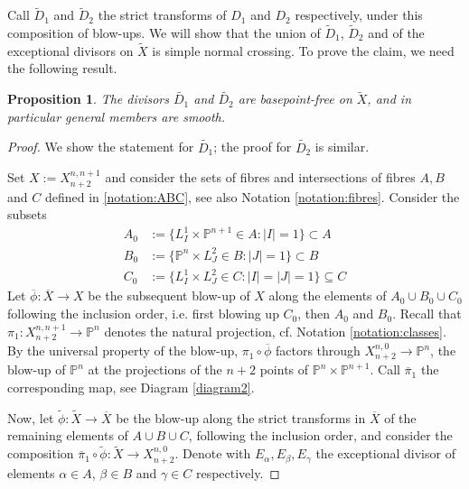 \documentclass[a4paper,11pt]{article}
\newtheorem{proposition}[theorem]{Proposition}
\newcommand{\PP}{\mathbb P}
\begin{document}
Call $\widetilde{D}_1$ and $\widetilde{D}_2$ the strict transforms of $D_1$ and $D_2$ respectively, under this composition of blow-ups. 
%
We will show that the union of $\widetilde{D}_1$, $\widetilde{D}_2$ and of the exceptional divisors on $\widetilde{X}$ is simple normal crossing. 
To prove the claim, we need the following result.

\begin{proposition}\label{basepoint-freeness}
 The divisors $\widetilde{D_1}$ and $\widetilde{D_2}$ are basepoint-free on $\widetilde{X}$, and in particular general members are smooth.
\end{proposition}
  \begin{proof}
We show the statement for $\widetilde{D_1}$; the proof for $\widetilde{D_2}$ is similar.

Set $X:=X^{n,n+1}_{n+2}$ and consider the sets of fibres and intersections of fibres $A,B$ and $C$ defined in \eqref{notation:ABC}, see also Notation \ref{notation:fibres}.
Consider the subsets 
\begin{align*} 
A_0& :=\{L_I^1\times\PP^{n+1}\in A: |I|=1\}\subset A\\ 
B_0&:=\{\PP^n\times L_J^2\in B: |J|=1\}\subset B\\
C_0&:=\{L^1_I\times L^2_J \in C: |I|=|J|=1\}\subseteq C
\end{align*}
Let  $\overline{\phi}:\overline{X}\to X$ be the subsequent blow-up of $X$ along the elements of $A_0\cup B_0\cup C_0$ following the inclusion order, i.e. first blowing up $C_0$, then $A_0$ and $B_0$. Recall that  $\pi_1 \colon X^{n,n+1}_{n+2}\to \PP^n$ denotes  the natural projection, cf. Notation \ref{notation:classes}.
%
By the universal property of the blow-up, $\pi_1\circ\overline{\phi}$ factors through $X^{n,0}_{n+2}\to \PP^n$, the blow-up of $\PP^n$ at the projections of the $n+2$ points of $\PP^n\times\PP^{n+1}$. Call $\overline{\pi}_1$ the corresponding map, see  Diagram \eqref{diagram2}.

Now, let $\widetilde{\phi}:\widetilde{X}\to  \overline{X}$ be the blow-up along the strict transforms in $\overline{X}$ of the remaining elements of $A\cup B \cup C$, following the inclusion order, and consider the composition 
$\overline{\pi}_1\circ\widetilde{\phi}:\widetilde{X}\to X^{n,0}_{n+2}$.
Denote with $E_\alpha, E_\beta, E_\gamma$ the exceptional divisor of elements $\alpha\in A$, $\beta \in B$ and $\gamma\in C$ respectively.



\end{proof}
\end{document}
